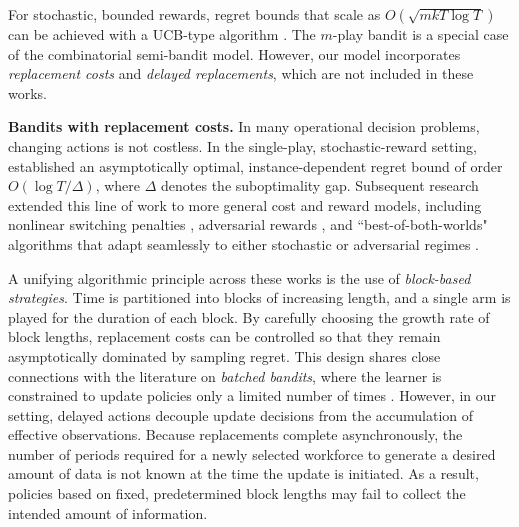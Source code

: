 \documentclass[opre,blindrev]{informs3}
\begin{document}
For stochastic, bounded rewards, regret bounds that scale as \(O(\sqrt{mkT\log T})\) can be achieved with a UCB-type algorithm \citep{kveton2015tight}. The \(m\)-play bandit is a special case of the combinatorial semi-bandit model. However, our model incorporates \emph{replacement costs} and \emph{delayed replacements}, which are not included in these works. 

{\bf Bandits with replacement costs.}
In many operational decision problems, changing actions is not costless. In the single-play, stochastic-reward setting, \cite{agrawal1988asymptswithcing} established an asymptotically optimal, instance-dependent regret bound of order \(O(\log T / \Delta)\), where \(\Delta\) denotes the suboptimality gap. Subsequent research extended this line of work to more general cost and reward models, including nonlinear switching penalties \citep{guha2009multi}, adversarial rewards \citep{cesa2013online}, and ``best-of-both-worlds" algorithms that adapt seamlessly to either stochastic or adversarial regimes \citep{dekel2014bandits, rouyer2021algorithm, amir2022better}. 

A unifying algorithmic principle across these works is the use of \emph{block-based strategies}. Time is partitioned into blocks of increasing length, and a single arm is played for the duration of each block. By carefully choosing the growth rate of block lengths, replacement costs can be controlled so that they remain asymptotically dominated by sampling regret. This design shares close connections with the literature on \emph{batched bandits}, where the learner is constrained to update policies only a limited number of times \citep{agrawal1990switching, gao2019batched, esfandiari2021regret, jin2021almost}. However, in our setting, delayed actions decouple update decisions from the accumulation of effective observations. Because replacements complete asynchronously, the number of periods required for a newly selected workforce to generate a desired amount of data is not known at the time the update is initiated. As a result, policies based on fixed, predetermined block lengths may fail to collect the intended amount of information. 
\end{document}
